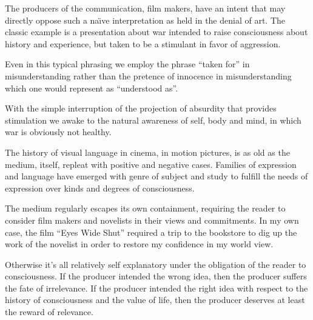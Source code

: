 The producers of the communication, film makers, have an intent that
may directly oppose such a na\"{\i}ve interpretation as held in the
denial of art.  The classic example is a presentation about war
intended to raise consciousness about history and experience, but
taken to be a stimulant in favor of aggression.

Even in this typical phrasing we employ the phrase ``taken for'' in
misunderstanding rather than the pretence of innocence in
misunderstanding which one would represent as ``understood as''.  

With the simple interruption of the projection of absurdity that
provides stimulation we awake to the natural awareness of self, body
and mind, in which war is obviously not healthy.

\vskip 0.25in

The history of visual language in cinema, in motion pictures, is as
old as the medium, itself, repleat with positive and negative cases.
Families of expression and language have emerged with genre of subject
and study to fulfill the needs of expression over kinds and degrees of
consciousness.

The medium regularly escapes its own containment, requiring the reader
to consider film makers and novelists in their views and commitments.
In my own case, the film ``Eyes Wide Shut'' required a trip to the
bookstore to dig up the work of the novelist in order to restore my
confidence in my world view.  

Otherwise it's all relatively self explanatory under the obligation of
the reader to consciousness.  If the producer intended the wrong idea,
then the producer suffers the fate of irrelevance.  If the producer
intended the right idea with respect to the history of consciousness
and the value of life, then the producer deserves at least the reward
of relevance.

\vfill
\bye
